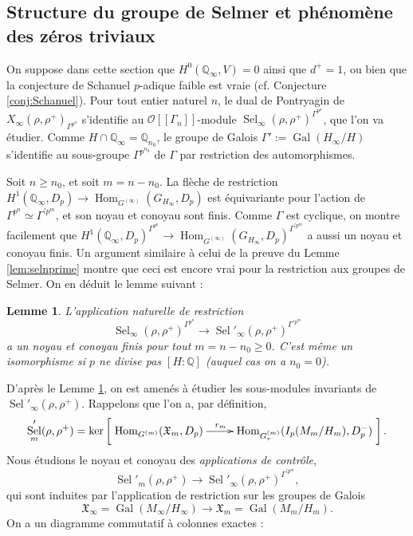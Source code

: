 \documentclass[12pt]{amsart}
\newcommand\bQ{\mathbb{Q}}
\newcommand\cO{\mathcal{O}}
\newcommand\gX{\mathfrak{X}}
\DeclareMathOperator{\Gal}{Gal}
\DeclareMathOperator{\Hom}{Hom}
\DeclareMathOperator{\Sel}{Sel}
\theoremstyle{defstyle}
\theoremstyle{thmstyle}
\newtheorem{lemme}[subsubsection]{Lemme}
\begin{document}
\subsection{Structure du groupe de Selmer et phénomène des zéros triviaux}\label{sec:zerostriviaux}

On suppose dans cette section que $H^0(\bQ_\infty,V)=0$ ainsi que $d^+=1$, ou bien que la conjecture de Schanuel $p$-adique faible est vraie (cf. Conjecture \ref{conj:Schanuel}). Pour tout entier naturel $n$, le dual de Pontryagin de $X_\infty(\rho,\rho^+)_{\Gamma^{p^n}}$ s'identifie au $\cO[[\Gamma_n]]$-module $\Sel_\infty(\rho,\rho^+)^{\Gamma^{p^n}}$, que l'on va étudier. Comme $H \cap \bQ_\infty=\bQ_{n_0}$, le groupe de Galois $\Gamma':=\Gal(H_\infty/H)$ s'identifie au sous-groupe $\Gamma^{p^{n_0}}$ de $\Gamma$ par restriction des automorphismes. 

Soit $n\geq n_0$, et soit $m=n-n_0$. La flèche de restriction $H^1(\bQ_\infty,D_p) \longrightarrow \Hom_{G^{(\infty)}}(G_{H_\infty},D_p)$ est équivariante pour l'action de $\Gamma^{p^n}\simeq \Gamma^{'p^m}$, et son noyau et conoyau sont finis. Comme $\Gamma$ est cyclique, on montre facilement que $H^1(\bQ_\infty,D_p)^{\Gamma^{p^n}} \longrightarrow \Hom_{G^{(\infty)}}(G_{H_\infty},D_p)^{\Gamma^{'p^m}}$
a aussi un noyau et conoyau finis. Un argument similaire à celui de la preuve du Lemme \ref{lem:selnprime} montre que ceci est encore vrai pour la restriction aux groupes de Selmer. On en déduit le lemme suivant :
\begin{lemme} \label{lem:sel->sel'}
	L'application naturelle de restriction 
	$$\Sel_\infty(\rho,\rho^+)^{\Gamma^{p^n}} \longrightarrow \Sel'_\infty(\rho,\rho^+)^{\Gamma^{'p^m}}$$
	a un noyau et conoyau finis pour tout $m=n-n_0\geq 0$. C'est même un isomorphisme si $p$ ne divise pas $[H:\bQ]$ (auquel cas on a $n_0=0$).
\end{lemme}

D'après le Lemme \ref{lem:sel->sel'}, on est amenés à étudier les sous-modules invariants de $\Sel'_\infty(\rho,\rho^+)$. Rappelons que l'on a, par définition,
$$\Sel'_m(\rho,\rho^+) = \ker \left[ \xymatrix{\Hom_{G^{(m)}}(\gX_m,D_p) \ar[r]^{r_m \qquad} &  \Hom_{G^{(m)}_v}(I_p(M_m/H_m),D_p^-) } \right]. $$ 
Nous étudions le noyau et conoyau des \textit{applications de contrôle},
$$ \Sel'_m(\rho,\rho^+) \longrightarrow \Sel'_\infty(\rho,\rho^+)^{\Gamma^{'p^m}},$$
qui sont induites par l'application de restriction sur les groupes de Galois 
$$\gX_\infty =\Gal(M_\infty/H_\infty) \longrightarrow \gX_m=\Gal(M_m/H_m).$$
On a un diagramme commutatif à colonnes exactes :
\end{document}
